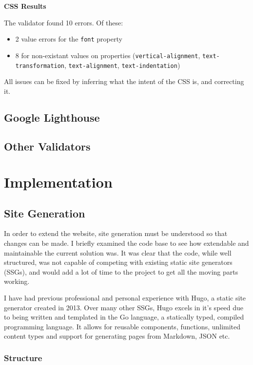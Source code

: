 \documentclass[frontabs,bsc,singlespacing,parskip,deptreport]{infthesis}
\begin{document}
\textbf{CSS Results}

The validator found 10 errors. Of these:

\begin{itemize}
    \item 2 value errors for the \verb|font| property
    \item 8 for non-existant values on properties (\verb|vertical-alignment|, \verb|text-transformation|, \verb|text-alignment|, \verb|text-indentation|)
\end{itemize}

All issues can be fixed by inferring what the intent of the CSS is, and correcting it.

\section{Google Lighthouse}

\section{Other Validators}

\chapter{Implementation}

\section{Site Generation}

In order to extend the website, site generation must be understood so that changes can be made. I briefly examined the code base to see how extendable and maintainable the current solution was. It was clear that the code, while well structured, was not capable of competing with existing static site generators (SSGs), and would add a lot of time to the project to get all the moving parts working.

I have had previous professional and personal experience with Hugo, a static site generator created in 2013. Over many other SSGs, Hugo excels in it's speed due to being written and templated in the Go language, a statically typed, compiled programming language. It allows for reusable components, functions, unlimited content types and support for generating pages from Markdown, JSON etc.

\subsection{Structure}
\end{document}

